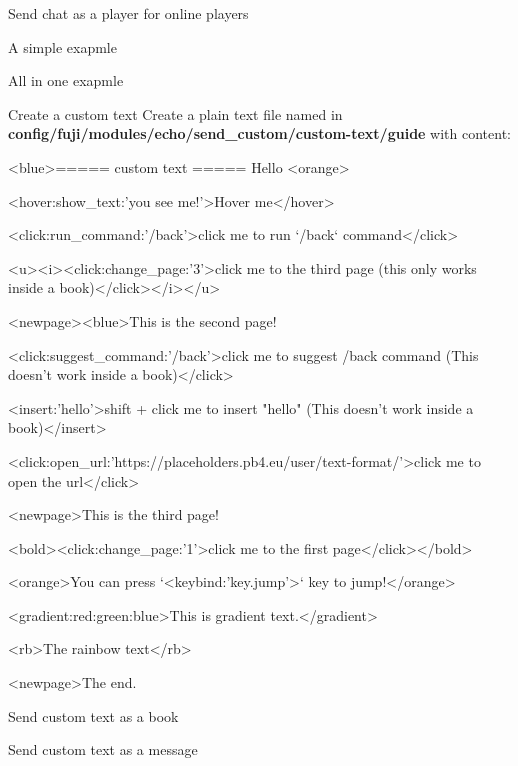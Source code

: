 \begin{example}{Send chat as a player for online players}
\end{example}

\begin{example}{A simple exapmle}
\end{example}

\begin{example}{All in one exapmle}
\end{example}

\begin{example}{Create a custom text}
    Create a plain text file named  in \textbf{config/fuji/modules/echo/send\_custom/custom-text/guide} with content:
    \begin{textcode}
        <blue>===== custom text =====
        Hello <orange>%

        <hover:show_text:'you see me!'>Hover me</hover>

        <click:run_command:'/back'>click me to run `/back` command</click>

        <u><i><click:change_page:'3'>click me to the third page (this only works inside a book)</click></i></u>

        <newpage><blue>This is the second page!

        <click:suggest_command:'/back'>click me to suggest /back command (This doesn't work inside a book)</click>

        <insert:'hello'>shift + click me to insert "hello" (This doesn't work inside a book)</insert>

        <click:open_url:'https://placeholders.pb4.eu/user/text-format/'>click me to open the url</click>

        <newpage>This is the third page!

        <bold><click:change_page:'1'>click me to the first page</click></bold>

        <orange>You can press `<keybind:'key.jump'>` key to jump!</orange>

        <gradient:red:green:blue>This is gradient text.</gradient>

        <rb>The rainbow text</rb>

        <newpage>The end.
    \end{textcode}
\end{example}

\begin{example}{Send custom text as a book}
\end{example}

\begin{example}{Send custom text as a message}
\end{example}
